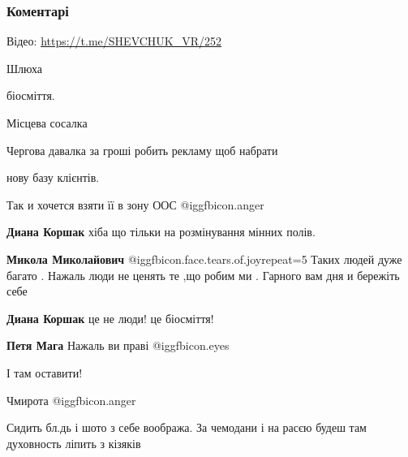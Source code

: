  
 
 
 
 
\subsubsection{Коментарі}
\label{sec:21_08_2021.fb.shevchuk_vladislav.1.izvinenia_ukrainstvo_nezalezhnist.cmt}

\begin{itemize} %
Відео: \url{https://t.me/SHEVCHUK_VR/252}


Шлюха

біосміття.

Місцева сосалка

Чергова давалка за гроші робить рекламу щоб набрати \par нову базу клієнтів.

Так и хочется взяти її в зону ООС  @igg{fbicon.anger} 


\begin{itemize} %
\textbf{Диана Коршак} хіба що тільки на розмінування мінних полів.

\textbf{Микола Миколайович}  @igg{fbicon.face.tears.of.joy}{repeat=5} Таких людей дуже багато .
Нажаль люди не ценять те ,що робим ми .
Гарного вам дня и бережіть себе

\textbf{Диана Коршак} це не люди! це біосміття!

\textbf{Петя Мага} Нажаль ви праві  @igg{fbicon.eyes} 

І там оставити!
\end{itemize} %


Чмирота  @igg{fbicon.anger} 

Сидить бл.дь і шото з себе вообража. За чемодани і на расєю будеш там духовность ліпить з кізяків


\end{itemize}
